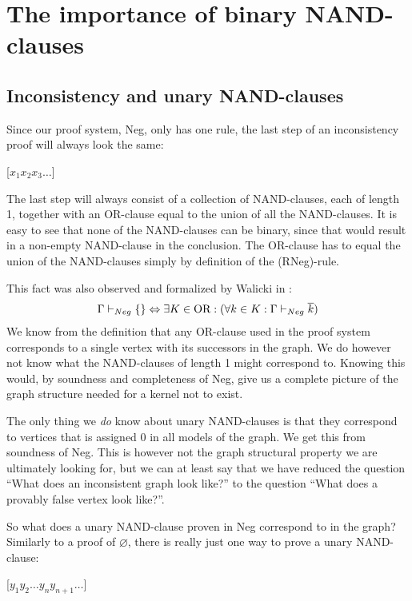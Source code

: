 \section{The importance of binary NAND-clauses}
\label{sec:The importance of binary NAND-clauses}
\subsection{Inconsistency and unary NAND-clauses}
\label{sub:Inconsistency and unary NAND-clauses}
Since our proof system, Neg, only has one rule, the last step of an inconsistency proof will always look the same:
\begin{prooftree*}
  \Hypo{\dots}
  [$x_1x_2x_3\dots$]{\varnothing}
\end{prooftree*}
The last step will always consist of a collection of NAND-clauses, each of length 1, together with an OR-clause equal to the union of all the NAND-clauses.
It is easy to see that none of the NAND-clauses can be binary, since that would result in a non-empty NAND-clause in the conclusion.
The OR-clause has to equal the union of the NAND-clauses simply by definition of the (RNeg)-rule.

This fact was also observed and formalized by Walicki in \cite{michal-completeness}:
\begin{align}
  \Gamma \vdash_{Neg} \{\} \Leftrightarrow \exists K \in \text{OR}: (\forall  k \in K: \Gamma \vdash_{Neg} \overline{k})
\end{align}
We know from the definition that any OR-clause used in the proof system corresponds to a single vertex with its successors in the graph.
We do however not know what the NAND-clauses of length 1 might correspond to.
Knowing this would, by soundness and completeness of Neg, give us a complete picture of the graph structure needed for a kernel not to exist.

The only thing we \textit{do} know about unary NAND-clauses is that they correspond to vertices that is assigned 0 in all models of the graph.
We get this from soundness of Neg.
This is however not the graph structural property we are ultimately looking for, but we can at least say that we have reduced the question ``What does an inconsistent graph look like?'' to the question ``What does a provably false vertex look like?''.

So what does a unary NAND-clause proven in Neg correspond to in the graph?
Similarly to a proof of $\varnothing$, there is really just one way to prove a unary NAND-clause:
\begin{prooftree*}
  \Hypo{\dots}
  \Hypo{\dots}
  [$y_1y_2\dots y_ny_{n+1}\dots$]{}
\end{prooftree*}
